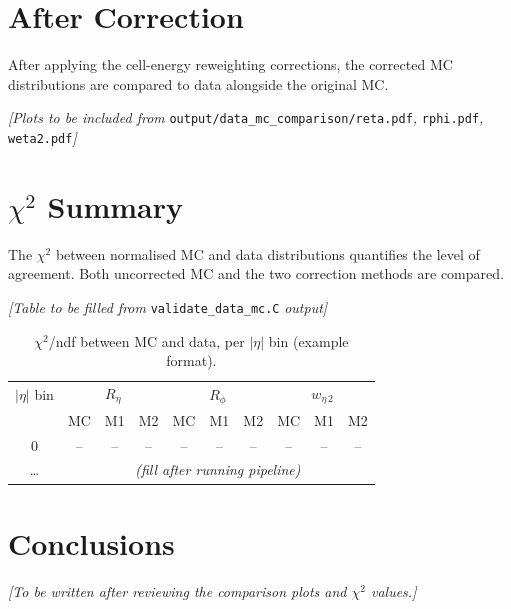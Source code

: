 \documentclass[a4paper,11pt]{article}
\begin{document}
\section{After Correction}

After applying the cell-energy reweighting corrections, the corrected MC
distributions are compared to data alongside the original MC.

\textit{[Plots to be included from} \texttt{output/data\_mc\_comparison/reta.pdf}\textit{,}
\texttt{rphi.pdf}\textit{,} \texttt{weta2.pdf}\textit{]}


\section{$\chi^2$ Summary}

The $\chi^2$ between normalised MC and data distributions quantifies the
level of agreement. Both uncorrected MC and the two correction methods
are compared.

\textit{[Table to be filled from} \texttt{validate\_data\_mc.C} \textit{output]}

\begin{table}[H]
\centering
\caption{$\chi^2$/ndf between MC and data, per $|\eta|$ bin (example format).}
\label{tab:chi2}
\begin{tabular}{c|ccc|ccc|ccc}
\toprule
$|\eta|$ bin & \multicolumn{3}{c|}{$R_\eta$} & \multicolumn{3}{c|}{$R_\phi$} & \multicolumn{3}{c}{$w_{\eta\,2}$} \\
             & MC & M1 & M2 & MC & M1 & M2 & MC & M1 & M2 \\
\midrule
0 & -- & -- & -- & -- & -- & -- & -- & -- & -- \\
\dots & \multicolumn{9}{c}{\textit{(fill after running pipeline)}} \\
\bottomrule
\end{tabular}
\end{table}

\section{Conclusions}

\textit{[To be written after reviewing the comparison plots and $\chi^2$ values.]}
\end{document}
